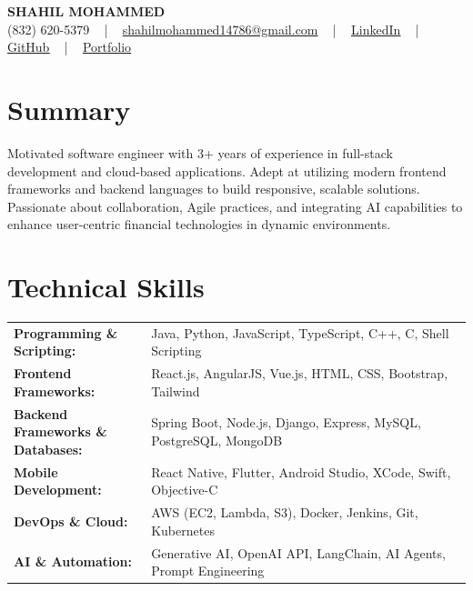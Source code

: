 \documentclass[letterpaper,11pt]{article}
\begin{document}
\begin{center}
    {\fontsize{14pt}{12pt}\selectfont \textbf{\MakeUppercase{Shahil Mohammed}}}\\ \vspace{2pt}
    \fontsize{10pt}{12pt}\selectfont (832) 620-5379 ~ | ~ \href{mailto:shahilmohammed14786@gmail.com}{shahilmohammed14786@gmail.com} ~ | ~  
    \href{https://www.linkedin.com/in/shahil-mohammed-9652931a1/}{\color{blue}\underline{LinkedIn}}  ~ | ~ 
    \href{https://github.com/freakbeast14}{\color{blue}\underline{GitHub}} ~ | ~ 
    \href{https://shahil-mohammed.netlify.app/}{\color{blue}\underline{Portfolio}}
    \vspace{-8pt}
\end{center}

\section{Summary}
\fontsize{9pt}{10pt}\selectfont
Motivated software engineer with 3+ years of experience in full-stack development and cloud-based applications. Adept at utilizing modern frontend frameworks and backend languages to build responsive, scalable solutions. Passionate about collaboration, Agile practices, and integrating AI capabilities to enhance user-centric financial technologies in dynamic environments.

 \vspace{-5pt}
 
\section{Technical Skills}
        \vspace{-14pt}
        \begin{table}[h]
            \fontsize{9pt}{10pt}\selectfont
            \begin{tabular}{p{0.3\linewidth} p{0.7\linewidth}}
                \textbf{Programming \& Scripting:} & Java, Python, JavaScript, TypeScript, C++, C, Shell Scripting \\
                \textbf{Frontend Frameworks:} & React.js, AngularJS, Vue.js, HTML, CSS, Bootstrap, Tailwind \\
                \textbf{Backend Frameworks \& Databases:} & Spring Boot, Node.js, Django, Express, MySQL, PostgreSQL, MongoDB \\
                \textbf{Mobile Development:} & React Native, Flutter, Android Studio, XCode, Swift, Objective-C \\
                \textbf{DevOps \& Cloud:} & AWS (EC2, Lambda, S3), Docker, Jenkins, Git, Kubernetes \\
                \textbf{AI \& Automation:} & Generative AI, OpenAI API, LangChain, AI Agents, Prompt Engineering \\
            \end{tabular}
        \end{table}
 \vspace{-15pt}
 
\end{document}
